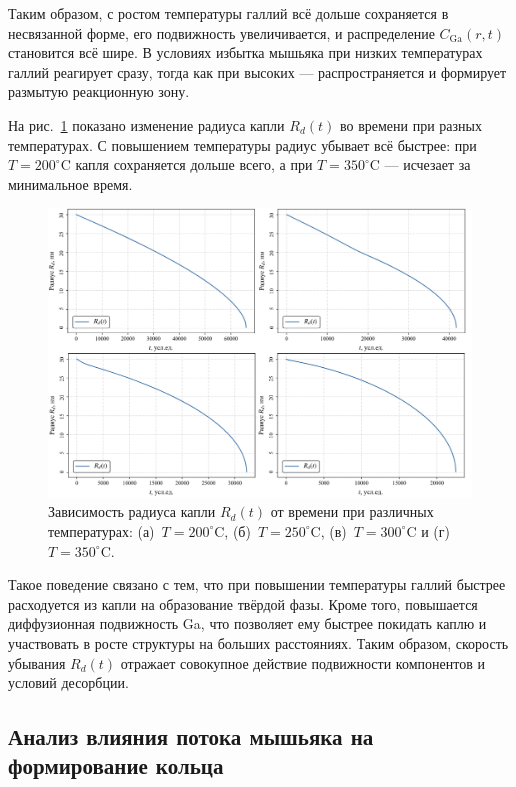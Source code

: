 \documentclass[14pt,oneside]{extarticle}
\begin{document}
Таким образом, с ростом температуры галлий всё дольше сохраняется в\\
несвязанной форме, его подвижность увеличивается, и распределение $C_{\text{Ga}}(r, t)$ становится всё шире. В условиях избытка мышьяка при низких температурах галлий реагирует сразу, тогда как при высоких — распространяется и формирует размытую реакционную зону.

На рис.~\ref{fig:r_d_t} показано изменение радиуса капли $R_d(t)$ во времени при разных температурах. С повышением температуры радиус убывает всё быстрее: при $T = 200^\circ$C капля сохраняется дольше всего, а при $T = 350^\circ$C — исчезает за минимальное время.

\begin{figure}[H]
    \begin{center}
    \includegraphics[width=15cm]{images/R_d_t.png}
    \caption{\label{fig:r_d_t} Зависимость радиуса капли $R_d(t)$ от времени при различных температурах: (а)~$T = 200^\circ$C, (б)~$T = 250^\circ$C, (в)~$T = 300^\circ$C и (г)~$T = 350^\circ$C.}
    \end{center}
\end{figure}

Такое поведение связано с тем, что при повышении температуры галлий быстрее расходуется из капли на образование твёрдой фазы. Кроме того, повышается диффузионная подвижность Ga, что позволяет ему быстрее покидать каплю и участвовать в росте структуры на больших расстояниях. Таким образом, скорость убывания $R_d(t)$ отражает совокупное действие подвижности компонентов и условий десорбции.

\subsection{Анализ влияния потока мышьяка на формирование кольца}
\end{document}
